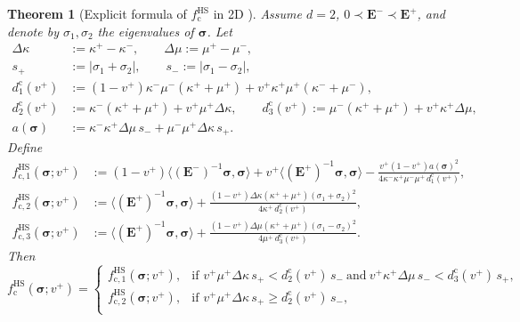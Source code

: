 \documentclass[preprint,3p]{elsarticle}
\newcommand{\tenss}[1]{\bm{\mathbf{#1}}}            %
\newcommand{\tensf}[1]{\bm{\mathbf{#1}}}            %
\newcommand{\stress}{\tenss{\sigma}}                %
\newcommand{\Emin}{\tensf{E}^{-}}                   %
\newcommand{\Emax}{\tensf{E}^{+}}                   %
\newtheorem{theorem}{Theorem}[section]
\begin{document}
\begin{theorem}[Explicit formula of $f_{\mathrm{c}}^{\mathrm{HS}}$ in 2D {\citep[Theorem~2]{Burazin2021}}]\label{th:burazin_explicit_fc}
Assume $d=2$, $0 \prec \Emin\prec \Emax$, and denote by $\sigma_1,\sigma_2$ the eigenvalues of $\stress$. Let
%
\begin{subequations}
\begin{align}
\Delta\kappa&:=\kappa^+-\kappa^-,\qquad
\Delta\mu:=\mu^+-\mu^-,\\
s_+&:=\lvert\sigma_1+\sigma_2\rvert,\qquad
s_-:=\lvert\sigma_1-\sigma_2\rvert,\\
d_1^{\mathrm c}(v^+)&:=(1-v^+)\kappa^-\mu^-(\kappa^++\mu^+)+v^+\kappa^+\mu^+(\kappa^-+\mu^-),\\
d_2^{\mathrm c}(v^+)&:=\kappa^-(\kappa^++\mu^+)+v^+\mu^+\Delta\kappa,\qquad
d_3^{\mathrm c}(v^+):=\mu^-(\kappa^++\mu^+)+v^+\kappa^+\Delta\mu,\\
a(\stress)&:=\kappa^-\kappa^+\Delta\mu\,s_-+\mu^-\mu^+\Delta\kappa\,s_+.
\end{align}
\end{subequations}
%
Define
%
\begin{subequations}
\begin{align}
f_{\mathrm c,1}^{\mathrm{HS}}(\stress;v^+)
&:=(1-v^+)\langle (\Emin)^{-1}\stress,\stress\rangle+v^+\langle (\Emax)^{-1}\stress,\stress\rangle
-\frac{v^+(1-v^+)a(\stress)^2}{4\kappa^-\kappa^+\mu^-\mu^+\,d_1^{\mathrm c}(v^+)},\\
f_{\mathrm c,2}^{\mathrm{HS}}(\stress;v^+)
&:=\langle (\Emax)^{-1}\stress,\stress\rangle
+\frac{(1-v^+)\Delta\kappa(\kappa^++\mu^+)(\sigma_1+\sigma_2)^2}{4\kappa^+\,d_2^{\mathrm c}(v^+)},\\
f_{\mathrm c,3}^{\mathrm{HS}}(\stress;v^+)
&:=\langle (\Emax)^{-1}\stress,\stress\rangle
+\frac{(1-v^+)\Delta\mu(\kappa^++\mu^+)(\sigma_1-\sigma_2)^2}{4\mu^+\,d_3^{\mathrm c}(v^+)}.
\end{align}
\end{subequations}
%
Then
%
\begin{equation}\label{eq:burazin_explicit_fc}
f_{\mathrm{c}}^{\mathrm{HS}}(\stress;v^+)=
\begin{cases}
f_{\mathrm c,1}^{\mathrm{HS}}(\stress;v^+),& \text{if }
v^+\mu^+\Delta\kappa\,s_+<d_2^{\mathrm c}(v^+)\,s_- \ \text{and}\ v^+\kappa^+\Delta\mu\,s_-<d_3^{\mathrm c}(v^+)\,s_+,\\
f_{\mathrm c,2}^{\mathrm{HS}}(\stress;v^+),& \text{if }
v^+\mu^+\Delta\kappa\,s_+\ge d_2^{\mathrm c}(v^+)\,s_-,\\

\end{cases}
\end{equation}
\end{theorem}
\end{document}
